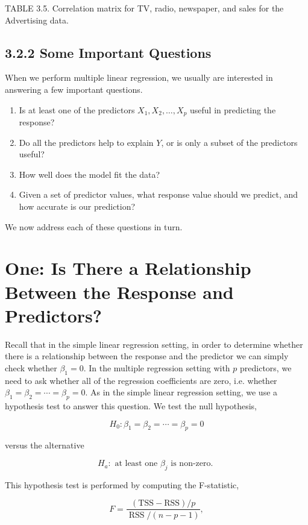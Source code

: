 \documentclass[10pt]{article}
\begin{document}
TABLE 3.5. Correlation matrix for TV, radio, newspaper, and sales for the Advertising data.

\subsection*{3.2.2 Some Important Questions}
When we perform multiple linear regression, we usually are interested in answering a few important questions.

\begin{enumerate}
  \item Is at least one of the predictors $X_{1}, X_{2}, \ldots, X_{p}$ useful in predicting the response?
  \item Do all the predictors help to explain $Y$, or is only a subset of the predictors useful?
  \item How well does the model fit the data?
  \item Given a set of predictor values, what response value should we predict, and how accurate is our prediction?
\end{enumerate}

We now address each of these questions in turn.

\section*{One: Is There a Relationship Between the Response and Predictors?}
Recall that in the simple linear regression setting, in order to determine whether there is a relationship between the response and the predictor we can simply check whether $\beta_{1}=0$. In the multiple regression setting with $p$ predictors, we need to ask whether all of the regression coefficients are zero, i.e. whether $\beta_{1}=\beta_{2}=\cdots=\beta_{p}=0$. As in the simple linear regression setting, we use a hypothesis test to answer this question. We test the null hypothesis,

$$
H_{0}: \beta_{1}=\beta_{2}=\cdots=\beta_{p}=0
$$

versus the alternative

$$
H_{a}: \text { at least one } \beta_{j} \text { is non-zero. }
$$

This hypothesis test is performed by computing the F-statistic,


\begin{equation*}
F=\frac{(\mathrm{TSS}-\mathrm{RSS}) / p}{\operatorname{RSS} /(n-p-1)}, \tag{3.23}
\end{equation*}
\end{document}
